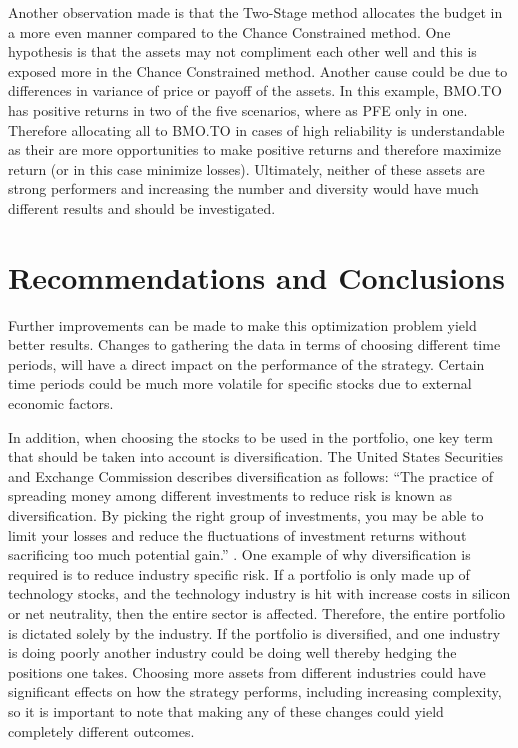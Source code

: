 \documentclass[12pt]{article}
\begin{document}
Another observation made is that the Two-Stage method allocates the budget in a more even manner compared to the Chance Constrained method. 
One hypothesis is that the assets may not compliment each other well and this is exposed more in the Chance Constrained method. 
Another cause could be due to differences in variance of price or payoff of the assets. In this example, BMO.TO has positive returns in two of the five scenarios, where as PFE only in one. Therefore allocating all to BMO.TO in cases of high reliability is understandable as their are more opportunities to make positive returns and therefore maximize return (or in this case minimize losses).
Ultimately, neither of these assets are strong performers and increasing the number and diversity would have much different results and should be investigated.

\section{Recommendations and Conclusions}
Further improvements can be made to make this optimization problem yield better results. Changes to gathering the data in terms of choosing different time periods, will have a direct impact on the performance of the strategy. Certain time periods could be much more volatile for specific stocks due to external economic factors. 

In addition, when choosing the stocks to be used in the portfolio, one key term that should be taken into account is diversification. The United States Securities and Exchange Commission describes diversification as follows: “The practice of spreading money among different investments to reduce risk is known as diversification. By picking the right group of investments, you may be able to limit your losses and reduce the fluctuations of investment returns without sacrificing too much potential gain.” \cite{diversity}.  One example of why diversification is required is to reduce industry specific risk. If a portfolio is only made up of technology stocks, and the technology industry is hit with increase costs in silicon or net neutrality, then the entire sector is affected. Therefore, the entire portfolio is dictated solely by the industry. If the portfolio is diversified, and one industry is doing poorly another industry could be doing well thereby hedging the positions one takes. Choosing more assets from different industries could have significant effects on how the strategy performs, including increasing complexity, so it is important to note that making any of these changes could yield completely different outcomes.
\end{document}
